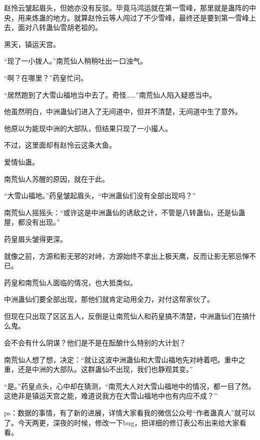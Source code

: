 \begin{this_body}
赵怜云皱起眉头，但她亦没有反驳。毕竟马鸿运就在第一雪峰，那里就是蛊阵的中央，用来炼蛊的地方。就算赵怜云等人闯过了不少雪峰，最终还是要到第一雪峰上去，面对八转蛊仙雪胡老祖的。

黑天，镇运天宫。

“现了一小拨人。”南荒仙人稍稍吐出一口浊气。

“啊？在哪里？”药皇忙问。

“居然跑到了大雪山福地当中去了。奇怪……”南荒仙人陷入疑惑当中。

他虽然明白，中洲蛊仙们进入了无间道中，但并不清楚，无间道中生了意外。

他原以为能现中洲的大部队，但结果只现了一小撮人。

不过，这里面却有赵怜云这条大鱼。

爱情仙蛊。

南荒仙人苏醒的原因，就在于此。

“大雪山福地。”药皇皱起眉头，“中洲蛊仙们没有全部出现吗？”

南荒仙人摇摇头：“或许这是中洲蛊仙的诱敌之计，不管是八转蛊仙，还是仙蛊屋，都没有出现。”

药皇眉头皱得更深。

就像之前，方源和影无邪的对峙，方源始终不拿出上极天鹰，反而让影无邪忌惮不已。

药皇和南荒仙人面临的情况，也大抵类似。

中洲蛊仙们要全部出现，那他们就肯定动用全力，对付这帮家伙了。

但现在只出现了区区五人，反倒是让南荒仙人和药皇搞不清楚，中洲蛊仙们在搞什么鬼。

会不会有什么阴谋？他们是不是在酝酿什么特别的大计划？

南荒仙人想了想，决定：“就让这波中洲蛊仙和大雪山福地先对峙着吧。重中之重，还是中洲的大部队。这群蛊仙不出现，我们也静观其变。”

“是。”药皇点头，心中却在猜测，“南荒大人对大雪山福地中的情况，都一目了然。这绝非是镇运天宫之能，难道说我方在大雪山福地中也有内应不成？”

ps：数据的事情，有了新的进展，详情大家看我的微信公众号“作者蛊真人”就可以了。今天两更，深夜的时候，修改一下bug，把详细的修订表公布出来给大家看看。

\end{this_body}

